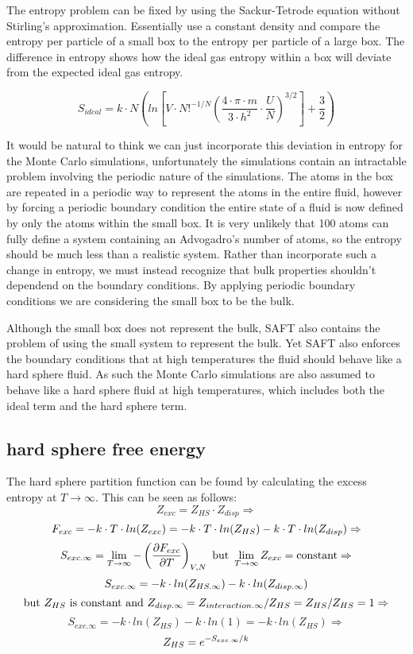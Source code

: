 The entropy problem can be fixed by using the Sackur-Tetrode equation without Stirling's approximation. Essentially use a constant density and compare the entropy per particle of a small box to the entropy per particle of a large box. The difference in entropy shows how the ideal gas entropy within a box will deviate from the expected ideal gas entropy.

$$S_{ideal}=k\cdot N \left ( ln\left [ V\cdot N!^{-1/N}\left ( \frac{4\cdot \pi\cdot m}{3\cdot h^2}\cdot\frac{U}{N} \right)^{3/2}  \right]+\frac{3}{2}\right )$$

It would be natural to think we can just incorporate this deviation in entropy for the Monte Carlo simulations, unfortunately the simulations contain an intractable problem involving the periodic nature of the simulations. The atoms in the box are repeated in a periodic way to represent the atoms in the entire fluid, however by forcing a periodic boundary condition the entire state of a fluid is now defined by only the atoms within the small box. It is very unlikely that 100 atoms can fully define a system containing an Advogadro's number of atoms, so the entropy should be much less than a realistic system. Rather than incorporate such a change in entropy, we must instead recognize that bulk properties shouldn't dependend on the boundary conditions. By applying periodic boundary conditions we are considering the small box to be the bulk. 

Although the small box does not represent the bulk, SAFT also contains the problem of using the small system to represent the bulk. Yet SAFT also enforces the boundary conditions that at high temperatures the fluid should behave like a hard sphere fluid. As such the Monte Carlo simulations are also assumed to behave like a hard sphere fluid at high temperatures, which includes both the ideal term and the hard sphere term.

\subsection{hard sphere free energy}
The hard sphere partition function can be found by calculating the excess entropy at $T\to\infty$. This can be seen as follows:
$$Z_{exc}=Z_{HS}\cdot Z_{disp}\Rightarrow$$
$$\newline F_{exc}=-k\cdot T\cdot ln(Z_{exc})=-k\cdot T\cdot ln(Z_{HS})-k\cdot T\cdot ln(Z_{disp})\Rightarrow $$
$$\newline S_{exc.\infty}=\lim_{T\to\infty}-\left ( \frac{\partial F_{exc}}{\partial T} \right ) _{V,N} \text{ but }\lim_{T\to\infty}Z_{exc}=\text{constant}\Rightarrow$$
$$\newline S_{exc.\infty}=-k\cdot ln(Z_{HS.\infty})-k\cdot ln(Z_{disp.\infty})$$
$$\newline \text{but }Z_{HS}\text{ is constant and }Z_{disp.\infty}=Z_{interaction.\infty}/Z_{HS}=Z_{HS}/Z_{HS}=1 \Rightarrow$$
$$S_{exc.\infty}=-k\cdot ln(Z_{HS})-k\cdot ln(1)=-k\cdot ln(Z_{HS}) \Rightarrow$$
$$\newline Z_{HS}=e^{-S_{exc.\infty}/k}$$

